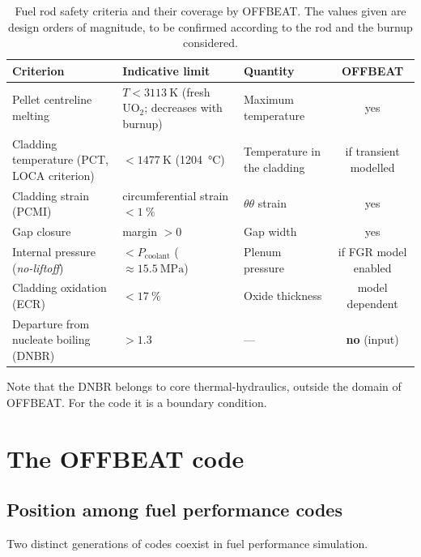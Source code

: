 \begin{table}[htbp]
\centering
\caption[Safety criteria and coverage by OFFBEAT]{Fuel rod safety criteria and
their coverage by OFFBEAT. The values given are design orders of magnitude, to
be confirmed according to the rod and the burnup considered.}
\label{tab:criteres}
\small
\begin{tabularx}{\textwidth}{@{}>{\raggedright\arraybackslash}p{4.1cm}
                                >{\raggedright\arraybackslash}p{3.9cm}
                                X
                                c@{}}
\toprule
\textbf{Criterion} & \textbf{Indicative limit} & \textbf{Quantity} &
\textbf{OFFBEAT}\\
\midrule
Pellet centreline melting & $T < \SI{3113}{\kelvin}$ (fresh $\mathrm{UO_2}$;
  decreases with burnup) & Maximum temperature & yes\\
Cladding temperature (PCT, LOCA criterion) & $< \SI{1477}{\kelvin}$
  (\SI{1204}{\celsius}) & Temperature in the cladding & if transient modelled\\
Cladding strain (PCMI) & circumferential strain $< \SI{1}{\percent}$ &
  $\theta\theta$ strain & yes\\
Gap closure & margin $>0$ & Gap width & yes\\
Internal pressure (\textit{no-liftoff}) & $< P_{\text{coolant}}$
  ($\approx\SI{15.5}{\mega\pascal}$) & Plenum pressure & if FGR model enabled\\
Cladding oxidation (ECR) & $< \SI{17}{\percent}$ & Oxide thickness &
  model dependent\\
Departure from nucleate boiling (DNBR) & $> 1.3$ & --- & \textbf{no} (input)\\
\bottomrule
\end{tabularx}
\end{table}

Note that the DNBR belongs to core thermal-hydraulics, outside the domain of
OFFBEAT. For the code it is a boundary condition.

\section{The OFFBEAT code}

\subsection{Position among fuel performance codes}

Two distinct generations of codes coexist in fuel performance simulation.


